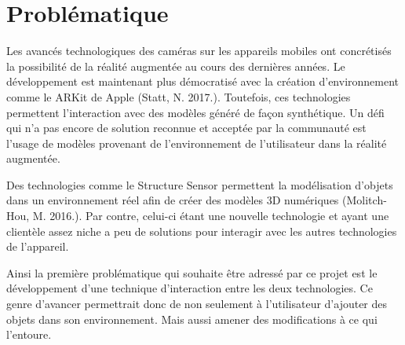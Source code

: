 \documentclass[letterpaper,twoside,12pt,french]{report}
\begin{document}
\section*{Problématique}
Les avancés technologiques des caméras sur les appareils mobiles ont concrétisés la possibilité
de la réalité augmentée au cours des dernières années. Le développement est maintenant plus
démocratisé avec la création d'environnement comme le ARKit de Apple (Statt, N. 2017.).
Toutefois, ces technologies permettent l'interaction avec des modèles généré de façon
synthétique. Un défi qui n'a pas encore de solution reconnue et acceptée par la communauté est
l'usage de modèles provenant de l'environnement de l'utilisateur dans la réalité augmentée.
\par
Des technologies comme le Structure Sensor permettent la modélisation d'objets dans un
environnement réel afin de créer des modèles 3D numériques (Molitch-Hou, M. 2016.). Par contre,
celui-ci étant une nouvelle technologie et ayant une clientèle assez niche a peu de solutions
pour interagir avec les autres technologies de l'appareil.
\par
Ainsi la première problématique qui souhaite être adressé par ce projet est le développement
d'une technique d'interaction entre les deux technologies. Ce genre d'avancer permettrait donc
de non seulement à l'utilisateur d'ajouter des objets dans son environnement. Mais aussi
amener des modifications à ce qui l'entoure.
\end{document}

